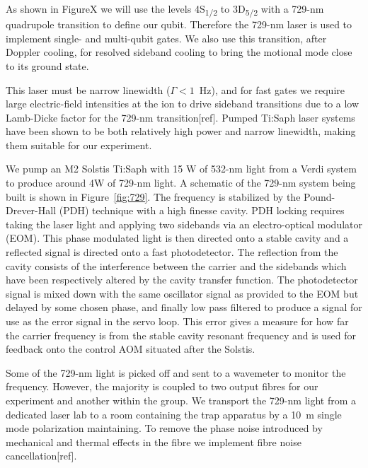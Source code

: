 \documentclass[12pt]{iopart}
\begin{document}
As shown in FigureX we will use the levels
4S\textsubscript{1/2} to 3D\textsubscript{5/2} with a 729-nm
quadrupole transition to define our qubit. Therefore the 729-nm laser
is used to implement single- and multi-qubit gates. We also use this
transition, after Doppler cooling, for resolved sideband cooling to
bring the motional mode close to its ground state.

This laser must be narrow linewidth ($\Gamma < 1$~Hz), and for fast gates we require
large electric-field intensities at the ion to drive sideband transitions due to a low
Lamb-Dicke factor for the 729-nm transition[ref].
Pumped Ti:Saph laser systems have been shown to be both relatively
high power and narrow linewidth, making them suitable for our
experiment.

We pump an M2 Solstis Ti:Saph with 15 W of 532-nm light from a Verdi
system to produce around 4W of 729-nm light.  A schematic of the
729-nm system being built is shown in Figure~\ref{fig:729}. The
frequency is
stabilized by the Pound-Drever-Hall (PDH) technique with a high
finesse cavity. PDH locking requires taking the laser light and
applying two sidebands via an electro-optical modulator (EOM). This
phase modulated light is then directed onto a stable cavity and a
reflected signal is directed onto a fast photodetector. The reflection
from the cavity consists of the interference between the carrier and
the sidebands which have been respectively altered by the cavity
transfer function. The photodetector signal is mixed down with the
same oscillator signal as provided to the EOM but delayed by some chosen
phase, and finally low pass filtered to produce a signal for use as
the error signal in the servo loop.  This error gives a measure for
how far the carrier frequency is from the stable cavity resonant
frequency and is used for feedback onto the control AOM situated after
the Solstis.

Some of the 729-nm light is picked off and sent to a wavemeter to
monitor the frequency. However, the majority is coupled to two output
fibres for our experiment and another within the group. We transport
the 729-nm light from a dedicated laser lab to a room containing the
trap apparatus by a 10~m single mode polarization maintaining.  To
remove the phase noise introduced by mechanical and thermal effects in
the fibre we implement fibre noise cancellation[ref].



\end{document}
